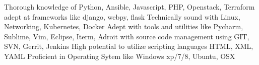 
\begin{cvskills}
  \cvskill
    {Thorough knowledge of }
    {Python, Ansible, Javascript, PHP, Openstack, Terraform}
  \cvskill
    {adept at frameworks like}
    {django, webpy, flask}
  \cvskill
    {Technically sound with}
    {Linux, Networking, Kubernetes, Docker}
  \cvskill
    {Adept with tools and utilities like}
    {Pycharm, Sublime, Vim, Eclipse, Iterm, }
  \cvskill
    {Adroit with source code management using}
    {GIT, SVN, Gerrit, Jenkins}
  \cvskill
    {High potential to utilize scripting languages}
    {HTML, XML, YAML}
  \cvskill
  {Proficient in Operating Sytem like}
  {Windows xp/7/8, Ubuntu, OSX}
\end{cvskills}